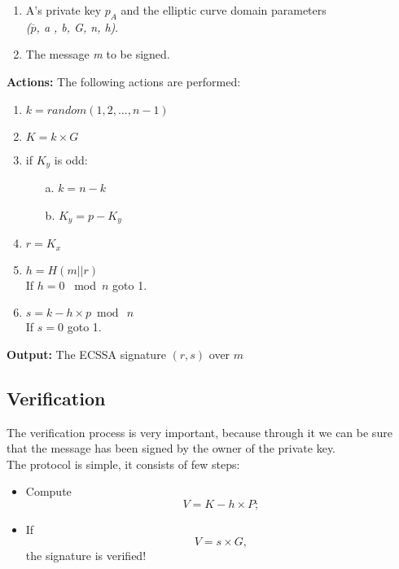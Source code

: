 \hspace{1.1cm}
\begin{minipage}[l]{2\linewidth}
\begin{enumerate}
	\item A's private key  \textit{$p_{A}$} and the elliptic curve domain parameters\\ \textit{($\overline{p}$, a , b, G, n, h)}.
	\item The message \textit{m} to be signed.\\
\end{enumerate}
\end{minipage}


\textbf{Actions:} The following actions are performed:

\hspace{1.2cm}
\begin{minipage}[l]{2\linewidth}
	\begin{enumerate}
		\item $\textit{k}=random({1, 2, \dots, n-1})$
		\item $K=k \times G$
		\item if $K_{y}$ is odd:
		\begin{itemize}
		      \item[a.] $k=n-k$
		      \item[b.] $K_{y}=p-K_{y}$
		\end{itemize}
		\item $r=K_{x}$
		\item $h=H(m||r)$\\
		If $h=0$ \ mod\ $n$ goto 1.
		\item $s=k - h \times p \bmod\ n$ \\
		If $s=0$ goto 1.
	\end{enumerate}
\end{minipage}

\textbf{Output:} The ECSSA signature $(r, s)$ over $m$


\subsection{Verification}
The verification process is very important, because through it we can be sure that the message has been signed by the owner of the private key.\\
The protocol is simple, it consists of few steps:
\begin{itemize}
	\item Compute
	\begin{equation}
	\label{eqn:verif1}
	 V = K - h \times P;
	 \end{equation}
	\item If 
	\begin{equation}
	\label{eqn:verif2}
	V = s \times G,
	\end{equation} the signature is verified!
\end{itemize}

